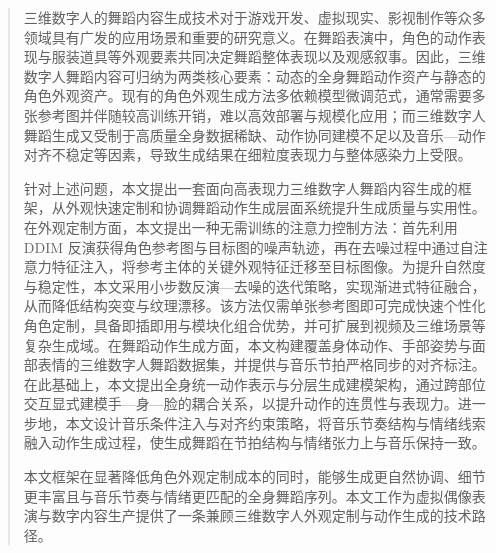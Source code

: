 

\begin{abstract}

三维数字人的舞蹈内容生成技术对于游戏开发、虚拟现实、影视制作等众多领域具有广发的应用场景和重要的研究意义。在舞蹈表演中，角色的动作表现与服装道具等外观要素共同决定舞蹈整体表现以及观感叙事。因此，三维数字人舞蹈内容可归纳为两类核心要素：动态的全身舞蹈动作资产与静态的角色外观资产。现有的角色外观生成方法多依赖模型微调范式，通常需要多张参考图并伴随较高训练开销，难以高效部署与规模化应用；而三维数字人舞蹈生成又受制于高质量全身数据稀缺、动作协同建模不足以及音乐—动作对齐不稳定等因素，导致生成结果在细粒度表现力与整体感染力上受限。

针对上述问题，本文提出一套面向高表现力三维数字人舞蹈内容生成的框架，从外观快速定制和协调舞蹈动作生成层面系统提升生成质量与实用性。在外观定制方面，本文提出一种无需训练的注意力控制方法：首先利用 DDIM 反演获得角色参考图与目标图的噪声轨迹，再在去噪过程中通过自注意力特征注入，将参考主体的关键外观特征迁移至目标图像。为提升自然度与稳定性，本文采用小步数反演—去噪的迭代策略，实现渐进式特征融合，从而降低结构突变与纹理漂移。该方法仅需单张参考图即可完成快速个性化角色定制，具备即插即用与模块化组合优势，并可扩展到视频及三维场景等复杂生成域。在舞蹈动作生成方面，本文构建覆盖身体动作、手部姿势与面部表情的三维数字人舞蹈数据集，并提供与音乐节拍严格同步的对齐标注。在此基础上，本文提出全身统一动作表示与分层生成建模架构，通过跨部位交互显式建模手—身—脸的耦合关系，以提升动作的连贯性与表现力。进一步地，本文设计音乐条件注入与对齐约束策略，将音乐节奏结构与情绪线索融入动作生成过程，使生成舞蹈在节拍结构与情绪张力上与音乐保持一致。

本文框架在显著降低角色外观定制成本的同时，能够生成更自然协调、细节更丰富且与音乐节奏与情绪更匹配的全身舞蹈序列。本文工作为虚拟偶像表演与数字内容生产提供了一条兼顾三维数字人外观定制与动作生成的技术路径。

\end{abstract}


